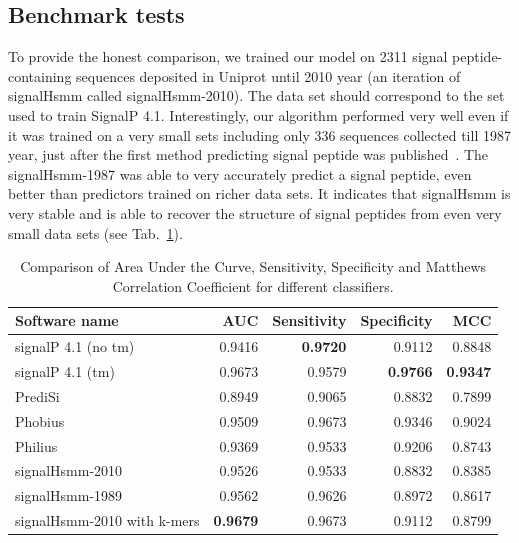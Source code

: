\documentclass[fleqn,10pt,twoside]{gcb15submission}
\begin{document}
\subsection*{Benchmark tests}

To provide the honest comparison, we trained our model on 2311 signal peptide-containing sequences deposited in Uniprot until 2010 year (an iteration of signalHsmm called signalHsmm-2010). The data set should correspond to the set used to train SignalP 4.1. Interestingly, our algorithm performed very well even if it was trained on a very small sets including only 336 sequences collected till 1987 year, just after the first method predicting signal peptide was published~\citep{1986vonheijnea}. The signalHsmm-1987 was able to very accurately predict a signal peptide, even better than predictors trained on richer data sets. It indicates that signalHsmm is very stable and is able to recover the structure of signal peptides from even very small data sets (see Tab.~\ref{tab:bench2010}).

\begin{table}[ht]
\small
\centering
\caption{Comparison of Area Under the Curve, Sensitivity, Specificity and Matthews Correlation Coefficient for different classifiers.} 
\begin{tabular}{lrrrr}
  \toprule
Software name & AUC & Sensitivity & Specificity & MCC \\ 
  \midrule
signalP 4.1 (no tm) \citep{2011petersensignalp} & 0.9416 & \textbf{0.9720} & 0.9112 & 0.8848 \\ 
   \rowcolor[gray]{0.85}signalP 4.1 (tm) \citep{2011petersensignalp} & 0.9673 & 0.9579 & \textbf{0.9766} & \textbf{0.9347} \\ 
  PrediSi \citep{2004hillerpredisi} & 0.8949 & 0.9065 & 0.8832 & 0.7899 \\ 
   \rowcolor[gray]{0.85}Phobius \citep{2004klla} & 0.9509 & 0.9673 & 0.9346 & 0.9024 \\ 
  Philius \citep{2008reynoldstransmembrane} & 0.9369 & 0.9533 & 0.9206 & 0.8743 \\ 
   \rowcolor[gray]{0.85}signalHsmm-2010 & 0.9526 & 0.9533 & 0.8832 & 0.8385 \\ 
  signalHsmm-1989 & 0.9562 & 0.9626 & 0.8972 & 0.8617 \\ 
   \rowcolor[gray]{0.85}signalHsmm-2010 with k-mers & \textbf{0.9679} & 0.9673 & 0.9112 & 0.8799 \\ 
   \bottomrule
\end{tabular}
\label{tab:bench2010}
\end{table}
\end{document}
